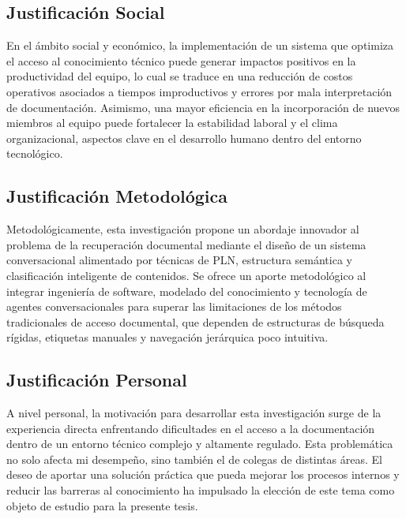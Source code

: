 \subsection{Justificación Social}
En el ámbito social y económico, la implementación de un sistema que optimiza el acceso al conocimiento técnico puede generar impactos positivos en la productividad del equipo, lo cual se traduce en una reducción de costos operativos asociados a tiempos improductivos y errores por mala interpretación de documentación. Asimismo, una mayor eficiencia en la incorporación de nuevos miembros al equipo puede fortalecer la estabilidad laboral y el clima organizacional, aspectos clave en el desarrollo humano dentro del entorno tecnológico.

\subsection{Justificación Metodológica}
Metodológicamente, esta investigación propone un abordaje innovador al problema de la recuperación documental mediante el diseño de un sistema conversacional alimentado por técnicas de PLN, estructura semántica y clasificación inteligente de contenidos. Se ofrece un aporte metodológico al integrar ingeniería de software, modelado del conocimiento y tecnología de agentes conversacionales para superar las limitaciones de los métodos tradicionales de acceso documental, que dependen de estructuras de búsqueda rígidas, etiquetas manuales y navegación jerárquica poco intuitiva.

\subsection{Justificación Personal}
A nivel personal, la motivación para desarrollar esta investigación surge de la experiencia directa enfrentando dificultades en el acceso a la documentación dentro de un entorno técnico complejo y altamente regulado. Esta problemática no solo afecta mi desempeño, sino también el de colegas de distintas áreas. El deseo de aportar una solución práctica que pueda mejorar los procesos internos y reducir las barreras al conocimiento ha impulsado la elección de este tema como objeto de estudio para la presente tesis.
